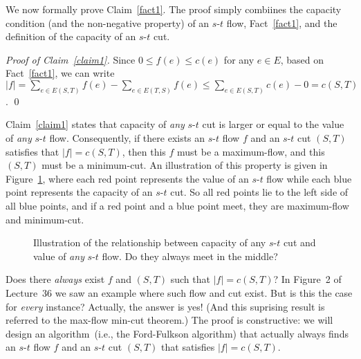 We now formally prove Claim~\ref{fact1}. The proof simply combiines the capacity condition (and the non-negative property) of an $s$-$t$ flow,
Fact~\ref{fact1}, and the definition of the capacity of an $s$-$t$ cut.

\emph{Proof of Claim~\ref{claim1}.} Since $0\le f(e) \le c(e)$ for any $e\in E$,
based on Fact~\ref{fact1}, we can write
$|f| = \sum_{e\in E(S, T)} f(e) - \sum_{e\in E(T, S)} f(e)
\le \sum_{e\in E(S, T)} c(e) - 0 = c(S, T)$. \qed

Claim~\ref{claim1} states that capacity of \emph{any} $s$-$t$ cut
is larger or equal to the value of \emph{any} $s$-$t$ flow.
Consequently, if there exists an $s$-$t$ flow $f$ and an $s$-$t$ cut $(S,T)$
satisfies that $|f| = c(S, T)$, then this $f$ must be a maximum-flow,
and this $(S, T)$ must be a minimum-cut.
An illustration of this property is given in Figure~\ref{fig:meet},
where each red point represents the value of an $s$-$t$ flow
while each blue point represents the capacity of an $s$-$t$ cut.
So all red points lie to the left side of all blue points,
and if a red point and a blue point meet, they are maximum-flow and minimum-cut.

\begin{figure}[h]
\centering{}
\caption{Illustration of the relationship between capacity of any $s$-$t$ cut
and value of \emph{any} $s$-$t$ flow.  Do they always meet in the middle?}
\label{fig:meet}
\end{figure}

Does there \emph{always} exist $f$ and $(S,T)$ such that $|f| = c(S,T)$?
In Figure~2 of Lecture~36 we saw an example where such flow and cut exist.
But is this the case for \emph{every} instance?
Actually, the answer is yes! (And this suprising result is referred to the max-flow min-cut theorem.)
The proof is constructive: we will design an algorithm~(i.e., the Ford-Fulkson algorithm)
that actually always finds an $s$-$t$ flow $f$ and an $s$-$t$ cut $(S, T)$
that satisfies $|f| = c(S, T)$.


